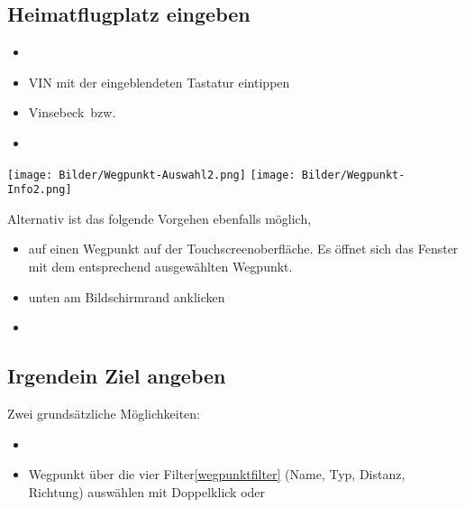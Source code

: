 \subsection{Heimatflugplatz eingeben}\label{Heimatflugplatz}
\begin{itemize}
\item {} \blink~\blink~\blink~ 
\item \textsf{VIN} mit der eingeblendeten Tastatur eintippen  \blink~ 
\item \textsf{Vinsebeck}~\dklick bzw.\  \blink~\far
\item {}
\end{itemize}
\begin{center}
\texttt{[image: Bilder/Wegpunkt-Auswahl2.png]}\qquad%
\texttt{[image: Bilder/Wegpunkt-Info2.png]}
\end{center}
Alternativ ist das folgende Vorgehen ebenfalls möglich,
\begin{itemize}
\item \dklick auf einen \textsf{Wegpunkt} auf der Touchscreenoberfläche. Es öffnet sich das Fenster  mit dem entsprechend ausgewählten Wegpunkt.
\item \far  unten am Bildschirmrand  anklicken
\item  {}
\end{itemize}
\subsection{Irgendein Ziel angeben}\label{Irgendeinzieleingeben}
Zwei grundsätzliche Möglichkeiten:

\begin{itemize}
\item {}\blink~\blink~
\item Wegpunkt über die vier Filter\ref{wegpunktfilter} (Name, Typ, Distanz, Richtung) auswählen mit Doppelklick oder  \blink~
\end{itemize}

